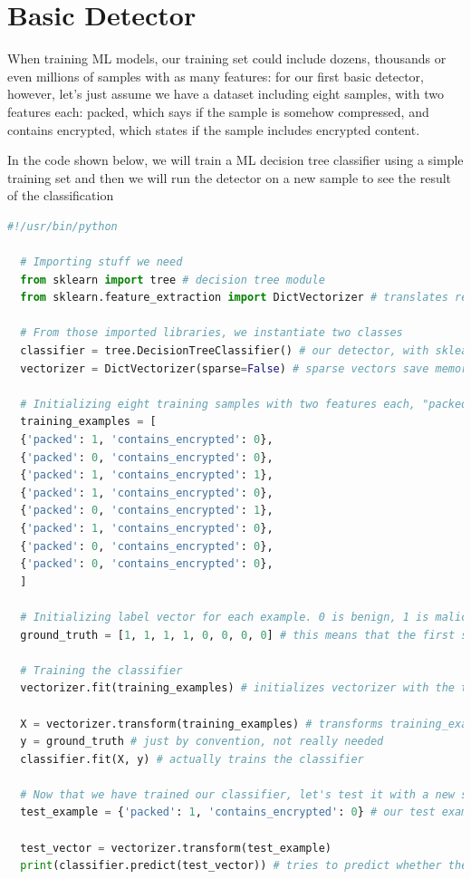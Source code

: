 \documentclass[]{project_plan}
\begin{document}
\section{Basic Detector}

When training ML models, our training set could include dozens, thousands
or even millions of samples with as many features: for our first basic detector,
however, let’s just assume we have a dataset including eight samples, with two
features each: packed, which says if the sample is somehow compressed, and
contains encrypted, which states if the sample includes encrypted content.

In the code shown below, we will train a ML decision tree classifier using a
simple training set and then we will run the detector on a new sample to see
the result of the classification

\begin{lstlisting}[language=python]
  #!/usr/bin/python

  # Importing stuff we need
  from sklearn import tree # decision tree module
  from sklearn.feature_extraction import DictVectorizer # translates readable training data in "DICTionary form" to the Vector representation

  # From those imported libraries, we instantiate two classes
  classifier = tree.DecisionTreeClassifier() # our detector, with sklearn's default decision tree settings
  vectorizer = DictVectorizer(sparse=False) # sparse vectors save memory but are hard to use, hence we set this value to 'false'

  # Initializing eight training samples with two features each, "packed" and "contains_encrypted"
  training_examples = [
  {'packed': 1, 'contains_encrypted': 0},
  {'packed': 0, 'contains_encrypted': 0},
  {'packed': 1, 'contains_encrypted': 1},
  {'packed': 1, 'contains_encrypted': 0},
  {'packed': 0, 'contains_encrypted': 1},
  {'packed': 1, 'contains_encrypted': 0},
  {'packed': 0, 'contains_encrypted': 0},
  {'packed': 0, 'contains_encrypted': 0},
  ]

  # Initializing label vector for each example. 0 is benign, 1 is malicious
  ground_truth = [1, 1, 1, 1, 0, 0, 0, 0] # this means that the first sample in the training set is malicious, the second is malicious as well, etc.

  # Training the classifier
  vectorizer.fit(training_examples) # initializes vectorizer with the training data

  X = vectorizer.transform(training_examples) # transforms training_examples to vector form
  y = ground_truth # just by convention, not really needed
  classifier.fit(X, y) # actually trains the classifier

  # Now that we have trained our classifier, let's test it with a new sample
  test_example = {'packed': 1, 'contains_encrypted': 0} # our test example will be packed but won't contain encrypted data

  test_vector = vectorizer.transform(test_example)
  print(classifier.predict(test_vector)) # tries to predict whether the sample is malicious or not and prints the result
\end{lstlisting}
\end{document}
